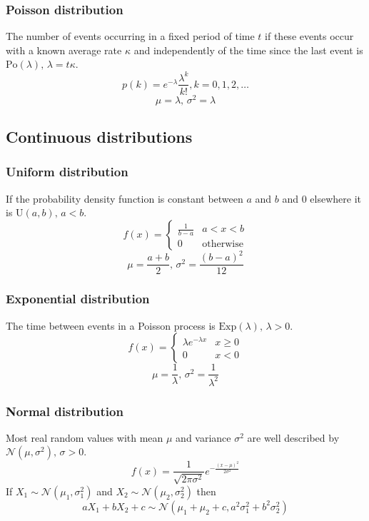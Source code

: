 \documentclass[11pt]{article}
\begin{document}
\begin{multicols}{3}
\subsubsection{Poisson distribution}
The number of events occurring in a fixed period of time $t$ if these events occur with a known average rate $\kappa$ and independently of the time since the last event is $\textrm{Po}(\lambda),\,\lambda=t\kappa$.
\[p(k)=e^{-\lambda}\frac{\lambda^k}{k!}, k=0,1,2,\dots\]
\[\mu=\lambda,\,\sigma^2=\lambda\]

\subsection{Continuous distributions}

\subsubsection{Uniform distribution}
If the probability density function is constant between $a$ and $b$ and 0 elsewhere it is $\textrm{U}(a,b),\,a<b$.
\[f(x) = \left\{
\begin{array}{cl}
\frac{1}{b-a} & a<x<b\\
0 & \textrm{otherwise}
\end{array}\right.\]
\[\mu=\frac{a+b}{2},\,\sigma^2=\frac{(b-a)^2}{12}\]

\subsubsection{Exponential distribution}
The time between events in a Poisson process is $\textrm{Exp}(\lambda),\,\lambda>0$.
\[f(x) = \left\{
\begin{array}{cl}
\lambda e^{-\lambda x} & x\geq0\\
0 & x<0
\end{array}\right.\]
\[\mu=\frac{1}{\lambda},\,\sigma^2=\frac{1}{\lambda^2}\]

\subsubsection{Normal distribution}
Most real random values with mean $\mu$ and variance $\sigma^2$ are well described by $\mathcal{N}(\mu,\sigma^2),\,\sigma>0$.
\[ f(x) = \frac{1}{\sqrt{2\pi\sigma^2}}e^{-\frac{(x-\mu)^2}{2\sigma^2}} \]
If $X_1 \sim \mathcal{N}(\mu_1,\sigma_1^2)$ and $X_2 \sim \mathcal{N}(\mu_2,\sigma_2^2)$ then
\[ aX_1 + bX_2 + c \sim \mathcal{N}(\mu_1+\mu_2+c,a^2\sigma_1^2+b^2\sigma_2^2) \]


\end{multicols}
\end{document}
